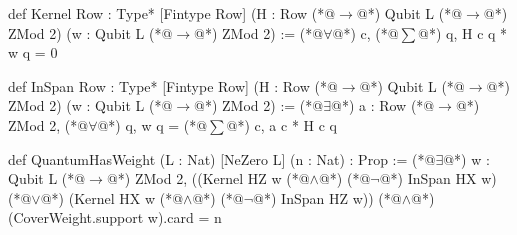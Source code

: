 def Kernel {Row : Type*} [Fintype Row] (H : Row (*@$\to$@*) Qubit L (*@$\to$@*) ZMod 2) (w : Qubit L (*@$\to$@*) ZMod 2) :=
  (*@$\forall$@*) c, (*@$\sum$@*) q, H c q * w q = 0

def InSpan {Row : Type*} [Fintype Row] (H : Row (*@$\to$@*) Qubit L (*@$\to$@*) ZMod 2) (w : Qubit L (*@$\to$@*) ZMod 2) :=
  (*@$\exists$@*) a : Row (*@$\to$@*) ZMod 2, (*@$\forall$@*) q, w q = (*@$\sum$@*) c, a c * H c q

def QuantumHasWeight (L : Nat) [NeZero L] (n : Nat) : Prop :=
  (*@$\exists$@*) w : Qubit L (*@$\to$@*) ZMod 2,
    ((Kernel HZ w (*@$\land$@*) (*@$\neg$@*) InSpan HX w) (*@$\lor$@*) (Kernel HX w (*@$\land$@*) (*@$\neg$@*) InSpan HZ w)) (*@$\land$@*)
      (CoverWeight.support w).card = n

